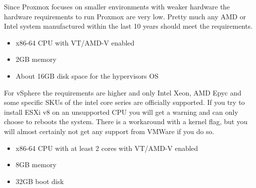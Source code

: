 Since Proxmox focuses on smaller environments with weaker hardware the hardware requirements to run Proxmox are very low. Pretty much any AMD or Intel system manufactured within the last 10 years should meet the requirements.

\begin{itemize}
	\item x86-64 CPU with VT/AMD-V enabled
	\item 2GB memory
	\item About 16GB disk space for the hypervisors OS
\end{itemize}

For vSphere the requirements are higher and only Intel Xeon, AMD Epyc and some specific SKUs of the intel core series are officially supported. If you try to install ESXi v8 on an unsupported CPU you will get a warning and can only choose to reboots the system. There is a workaround with a kernel flag, but you will almost certainly not get any support from VMWare if you do so. 

\begin{itemize}
	\item x86-64 CPU with at least 2 cores with VT/AMD-V enabled
	\item 8GB memory
	\item 32GB boot disk
\end{itemize}